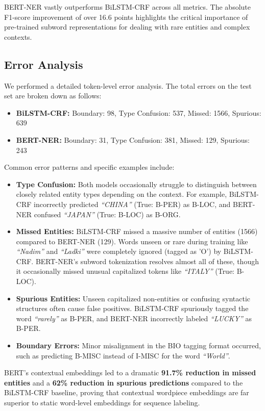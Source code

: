 \documentclass[12pt, a4paper]{article}
\begin{document}
BERT-NER vastly outperforms BiLSTM-CRF across all metrics. The absolute F1-score improvement of over 16.6 points highlights the critical importance of pre-trained subword representations for dealing with rare entities and complex contexts.

\subsection{Error Analysis}

We performed a detailed token-level error analysis. The total errors on the test set are broken down as follows:
\begin{itemize}
    \item \textbf{BiLSTM-CRF:} Boundary: 98, Type Confusion: 537, Missed: 1566, Spurious: 639
    \item \textbf{BERT-NER:} Boundary: 31, Type Confusion: 381, Missed: 129, Spurious: 243
\end{itemize}

Common error patterns and specific examples include:
\begin{itemize}
    \item \textbf{Type Confusion:} Both models occasionally struggle to distinguish between closely related entity types depending on the context. For example, BiLSTM-CRF incorrectly predicted \textit{``CHINA''} (True: B-PER) as B-LOC, and BERT-NER confused \textit{``JAPAN''} (True: B-LOC) as B-ORG. 
    \item \textbf{Missed Entities:} BiLSTM-CRF missed a massive number of entities (1566) compared to BERT-NER (129). Words unseen or rare during training like \textit{``Nadim''} and \textit{``Ladki''} were completely ignored (tagged as 'O') by BiLSTM-CRF. BERT-NER's subword tokenization resolves almost all of these, though it occasionally missed unusual capitalized tokens like \textit{``ITALY''} (True: B-LOC).
    \item \textbf{Spurious Entities:} Unseen capitalized non-entities or confusing syntactic structures often cause false positives. BiLSTM-CRF spuriously tagged the word \textit{``rarely''} as B-PER, and BERT-NER incorrectly labeled \textit{``LUCKY''} as B-PER.
    \item \textbf{Boundary Errors:} Minor misalignment in the BIO tagging format occurred, such as predicting B-MISC instead of I-MISC for the word \textit{``World''}.
\end{itemize}

BERT's contextual embeddings led to a dramatic \textbf{91.7\% reduction in missed entities} and a \textbf{62\% reduction in spurious predictions} compared to the BiLSTM-CRF baseline, proving that contextual wordpiece embeddings are far superior to static word-level embeddings for sequence labeling.
\end{document}
